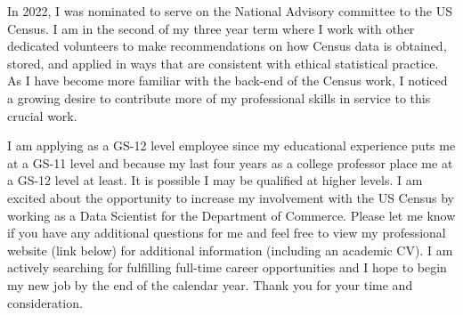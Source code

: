 \documentclass[11pt,a4paper,sans]{moderncv}
\begin{document}
In 2022, I was nominated to serve on the National Advisory committee to the US Census. I am in the second of my three year term where I work with other dedicated volunteers to make recommendations on how Census data is obtained, stored, and applied in ways that are consistent with ethical statistical practice. As I have become more familiar with the back-end of the Census work, I noticed a growing desire to contribute more of my professional skills in service to this crucial work.   
		
	\vspace{.5cm} 
	
	I am applying as a GS-12 level employee since my educational experience puts me at a GS-11 level and because my last four years as a college professor place me at a GS-12 level at least. It is possible I may be qualified at higher levels. I am excited about the opportunity to increase my involvement with the US Census by working as a Data Scientist for the Department of Commerce. Please let me know if you have any additional questions for me and feel free to view my professional website (link below) for additional information (including an academic CV). I am actively searching for fulfilling full-time career opportunities and I hope to begin my new job by the end of the calendar year. Thank you for your time and consideration.\\
	
	\vspace{1cm}
	
	\makeletterclosing
	
\end{document}
